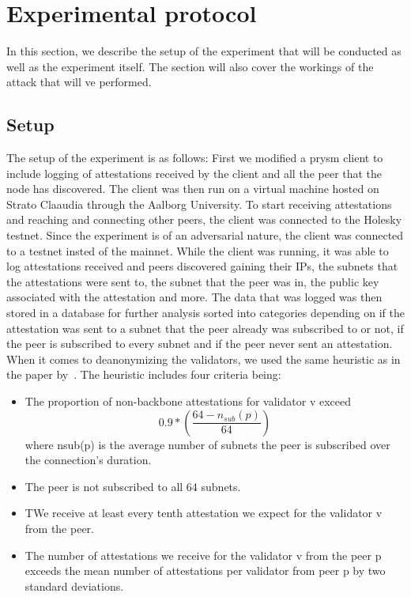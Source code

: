 

\section{Experimental protocol}\label{sec:experimental-protocol}
In this section, we describe the setup of the experiment that will be conducted as well as the experiment itself.
The section will also cover the workings of the attack that will ve performed.

\subsection{Setup}\label{subsec:setup}
The setup of the experiment is as follows: First we modified a prysm client to include logging of attestations received by the client and all the peer that the node has discovered.
The client was then run on a virtual machine hosted on Strato Claaudia through the Aalborg University.
To start receiving attestations and reaching and connecting other peers, the client was connected to the Holesky testnet.
Since the experiment is of an adversarial nature, the client was connected to a testnet insted of the mainnet.
While the client was running, it was able to log attestations received and peers discovered gaining their IPs, the subnets that the attestations were sent to, the subnet that the peer was in, the public key associated with the attestation and more.
The data that was logged was then stored in a database for further analysis sorted into categories depending on if the attestation was sent to a subnet that the peer already was subscribed to or not, if the peer is subscribed to every subnet and if the peer never sent an attestation.
When it comes to deanonymizing the validators, we used the same heuristic as in the paper by~\cite{heimbach2024deanonymizingethereumvalidatorsp2p}. 
The heuristic includes four criteria being:
\begin{itemize}
    \item The proportion of non-backbone attestations for validator v exceed
    \begin{equation}
                                                                                 0.9*\left(\frac{64-n_{sub}(p)}{64}\right)
                                                                                 \label{eq:heurestic}
    \end{equation} where nsub(p) is the average number of subnets the peer is subscribed over the connection’s duration.
    \item The peer is not subscribed to all 64 subnets.
    \item TWe receive at least every tenth attestation we expect for the validator v from the peer.
    \item The number of attestations we receive for the validator v from the peer p exceeds the mean number of attestations per validator from peer p by two standard deviations.
\end{itemize}

